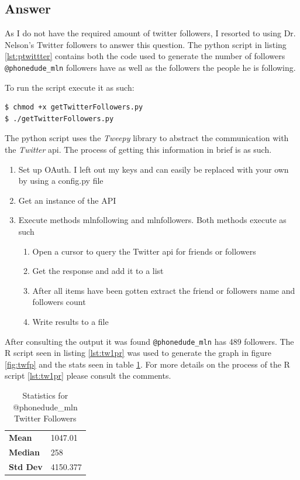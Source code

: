\documentclass[letterpaper,10pt]{article}
\begin{document}
\subsection*{Answer}

As I do not have the required amount of twitter followers, I resorted to using Dr. Nelson's Twitter followers to answer this question. The python script in listing \ref{lst:ptwittter} contains both the code used to generate the number of followers \verb+@phonedude_mln+ followers have as well as the followers the people he is following.  

To run the script execute it as such:
\begin{lstlisting}[frame=single]
$ chmod +x getTwitterFollowers.py
$ ./getTwitterFollowers.py
\end{lstlisting}

The python script uses the \emph{Tweepy} library to abstract the communication with the \emph{Twitter} api. The process of getting this information in brief is as such. 
\begin{enumerate}
\item Set up OAuth. I left out my keys and can easily be replaced with your own by using a config.py file
\item Get an instance of the API
\item Execute methods mlnfollowing and mlnfollowers. Both methods execute as such
\begin{enumerate}
\item Open a cursor to query the Twitter api for friends or followers
\item Get the response and add it to a list
\item After all items have been gotten extract the friend or followers name and followers count
\item Write results to a file
\end{enumerate}
\end{enumerate}

After consulting the output it was found \verb+@phonedude_mln+ has 489 followers.  
The R script seen in listing \ref{lst:tw1pr} was used to generate the graph in figure \ref{fig:twfp} and the stats seen in table \ref{stats:twfst}. For more details on the process of the R script \ref{lst:tw1pr} please consult the comments. 
\begin{table}
\centering
\begin{tabular}{ l l }
\textbf{Mean} & 1047.01 \\
\textbf{Median} & 258 \\
\textbf{Std Dev} &  4150.377 \\
\end{tabular}
\caption{Statistics for @phonedude\_mln Twitter Followers}
\label{stats:twfst}
\end{table}
\end{document}
